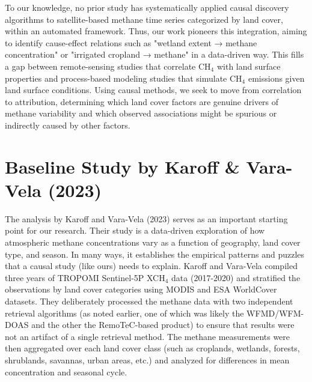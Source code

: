 To our knowledge, no prior study has systematically applied causal discovery algorithms to satellite-based methane time series categorized by land cover, within an automated framework. Thus, our work pioneers this integration, aiming to identify cause-effect relations such as "wetland extent → methane concentration" or "irrigated cropland → methane" in a data-driven way. This fills a gap between remote-sensing studies that correlate CH$_4$ with land surface properties and process-based modeling studies that simulate CH$_4$ emissions given land surface conditions. Using causal methods, we seek to move from correlation to attribution, determining which land cover factors are genuine drivers of methane variability and which observed associations might be spurious or indirectly caused by other factors.

\section{Baseline Study by Karoff \& Vara-Vela (2023)}
\label{sec:baseline}

The analysis by Karoff and Vara-Vela (2023) \cite{Karoff2023} serves as an important starting point for our research. Their study is a data-driven exploration of how atmospheric methane concentrations vary as a function of geography, land cover type, and season. In many ways, it establishes the empirical patterns and puzzles that a causal study (like ours) needs to explain. Karoff and Vara-Vela compiled three years of TROPOMI Sentinel-5P XCH$_4$ data (2017-2020) and stratified the observations by land cover categories using MODIS and ESA WorldCover datasets. They deliberately processed the methane data with two independent retrieval algorithms (as noted earlier, one of which was likely the WFMD/WFM-DOAS and the other the RemoTeC-based product) to ensure that results were not an artifact of a single retrieval method. The methane measurements were then aggregated over each land cover class (such as croplands, wetlands, forests, shrublands, \gls{savannas}, urban areas, etc.) and analyzed for differences in mean concentration and seasonal cycle.

